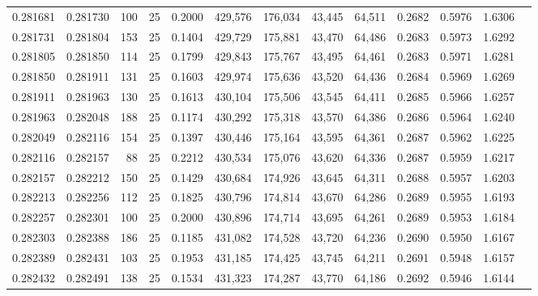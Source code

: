 \begin{tabular}{rrrrrrrrrrrrr}
0.281681 & 0.281730 &   100 &  25 &                                     0.2000 & 429,576 & 176,034 &  43,445 &  64,511 & 0.2682 & 0.5976 & 1.6306 \\
0.281731 & 0.281804 &   153 &  25 &                                     0.1404 & 429,729 & 175,881 &  43,470 &  64,486 & 0.2683 & 0.5973 & 1.6292 \\
0.281805 & 0.281850 &   114 &  25 &                                     0.1799 & 429,843 & 175,767 &  43,495 &  64,461 & 0.2683 & 0.5971 & 1.6281 \\
0.281850 & 0.281911 &   131 &  25 &                                     0.1603 & 429,974 & 175,636 &  43,520 &  64,436 & 0.2684 & 0.5969 & 1.6269 \\
0.281911 & 0.281963 &   130 &  25 &                                     0.1613 & 430,104 & 175,506 &  43,545 &  64,411 & 0.2685 & 0.5966 & 1.6257 \\
0.281963 & 0.282048 &   188 &  25 &                                     0.1174 & 430,292 & 175,318 &  43,570 &  64,386 & 0.2686 & 0.5964 & 1.6240 \\
0.282049 & 0.282116 &   154 &  25 &                                     0.1397 & 430,446 & 175,164 &  43,595 &  64,361 & 0.2687 & 0.5962 & 1.6225 \\
0.282116 & 0.282157 &    88 &  25 &                                     0.2212 & 430,534 & 175,076 &  43,620 &  64,336 & 0.2687 & 0.5959 & 1.6217 \\
0.282157 & 0.282212 &   150 &  25 &                                     0.1429 & 430,684 & 174,926 &  43,645 &  64,311 & 0.2688 & 0.5957 & 1.6203 \\
0.282213 & 0.282256 &   112 &  25 &                                     0.1825 & 430,796 & 174,814 &  43,670 &  64,286 & 0.2689 & 0.5955 & 1.6193 \\
0.282257 & 0.282301 &   100 &  25 &                                     0.2000 & 430,896 & 174,714 &  43,695 &  64,261 & 0.2689 & 0.5953 & 1.6184 \\
0.282303 & 0.282388 &   186 &  25 &                                     0.1185 & 431,082 & 174,528 &  43,720 &  64,236 & 0.2690 & 0.5950 & 1.6167 \\
0.282389 & 0.282431 &   103 &  25 &                                     0.1953 & 431,185 & 174,425 &  43,745 &  64,211 & 0.2691 & 0.5948 & 1.6157 \\
0.282432 & 0.282491 &   138 &  25 &                                     0.1534 & 431,323 & 174,287 &  43,770 &  64,186 & 0.2692 & 0.5946 & 1.6144 \\

\end{tabular}
